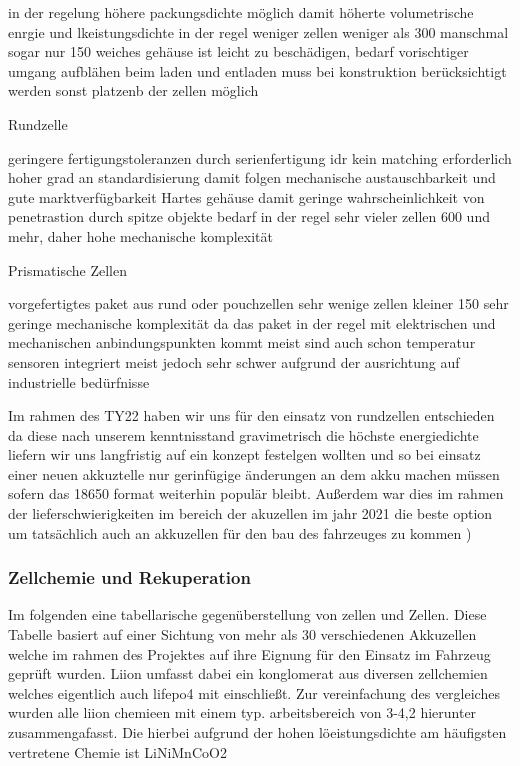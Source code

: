 in der regelung höhere packungsdichte möglich damit höherte volumetrische enrgie und lkeistungsdichte
in der regel weniger zellen weniger als 300 manschmal sogar nur 150
weiches gehäuse ist leicht zu beschädigen, bedarf vorischtiger umgang 
aufblähen beim laden und entladen muss bei konstruktion berücksichtigt werden sonst platzenb der zellen möglich


Rundzelle

geringere fertigungstoleranzen durch serienfertigung idr kein matching erforderlich
hoher grad an standardisierung damit folgen mechanische austauschbarkeit und gute marktverfügbarkeit
Hartes gehäuse damit geringe wahrscheinlichkeit von penetrastion durch spitze objekte
bedarf in der regel sehr vieler zellen 600 und mehr, daher hohe mechanische komplexität

Prismatische Zellen

vorgefertigtes paket aus rund oder pouchzellen
sehr wenige zellen kleiner 150
sehr geringe mechanische komplexität da das paket in der regel mit elektrischen und mechanischen anbindungspunkten kommt meist sind auch schon temperatur sensoren integriert
meist jedoch sehr schwer aufgrund der ausrichtung auf industrielle bedürfnisse


Im rahmen des TY22 haben wir uns für den einsatz von rundzellen entschieden da diese nach unserem kenntnisstand gravimetrisch die höchste energiedichte liefern wir uns langfristig auf ein konzept festelgen wollten und so bei einsatz einer neuen akkuztelle nur gerinfügige änderungen an dem akku machen müssen sofern das 18650 format weiterhin populär bleibt. Außerdem war dies im rahmen der lieferschwierigkeiten im bereich der akuzellen im jahr 2021 die beste option um tatsächlich auch an akkuzellen für den bau des fahrzeuges zu kommen
)

\subsubsection{Zellchemie und Rekuperation}

Im folgenden eine tabellarische gegenüberstellung von  zellen und  Zellen. Diese Tabelle basiert auf einer Sichtung von mehr als 30 verschiedenen Akkuzellen welche im rahmen des Projektes auf ihre Eignung für den Einsatz im Fahrzeug geprüft wurden. Liion umfasst dabei ein konglomerat aus diversen zellchemien welches eigentlich auch lifepo4 mit einschließt. Zur vereinfachung des vergleiches wurden alle liion chemieen mit einem typ. arbeitsbereich von 3-4,2 hierunter zusammengafasst. Die hierbei aufgrund der hohen löeistungsdichte am häufigsten vertretene Chemie ist LiNiMnCoO2



